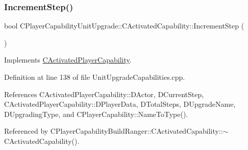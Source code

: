 \subsubsection{\texorpdfstring{Increment\+Step()}{IncrementStep()}}
{\footnotesize\ttfamily bool C\+Player\+Capability\+Unit\+Upgrade\+::\+C\+Activated\+Capability\+::\+Increment\+Step (\begin{DoxyParamCaption}{ }\end{DoxyParamCaption})\hspace{0.3cm}{\ttfamily [virtual]}}



Implements \hyperlink{classCActivatedPlayerCapability_a943b5999a57504399293250382c0ec6a}{C\+Activated\+Player\+Capability}.



Definition at line 138 of file Unit\+Upgrade\+Capabilities.\+cpp.



References C\+Activated\+Player\+Capability\+::\+D\+Actor, D\+Current\+Step, C\+Activated\+Player\+Capability\+::\+D\+Player\+Data, D\+Total\+Steps, D\+Upgrade\+Name, D\+Upgrading\+Type, and C\+Player\+Capability\+::\+Name\+To\+Type().



Referenced by C\+Player\+Capability\+Build\+Ranger\+::\+C\+Activated\+Capability\+::$\sim$\+C\+Activated\+Capability().


